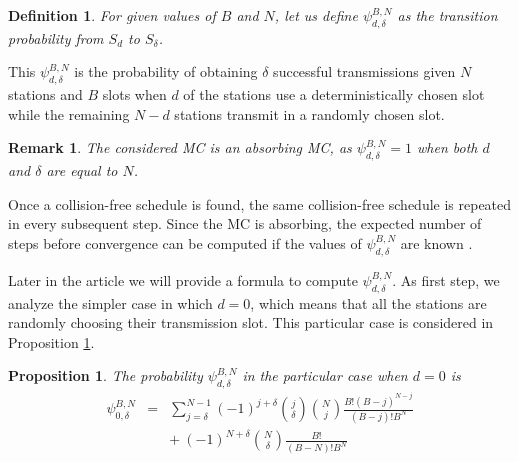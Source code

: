 \documentclass[journal]{IEEEtran}
\newtheorem{definition}{Definition}
\newtheorem{proposition}{Proposition}
\newtheorem{remark}{Remark}
\begin{document}
\begin{definition}
For given values of $B$ and $N$, let us define $\psi_{d,\delta}^{B,N}$ as the transition probability from $S_d$ to $S_\delta$. 
\end{definition}

This $\psi_{d,\delta}^{B,N}$ is the probability of obtaining $\delta$ successful transmissions given $N$ stations and $B$ slots when $d$ of the stations use a deterministically chosen slot while the remaining $N-d$ stations transmit in a randomly chosen slot.

\begin{remark}
The considered MC is an absorbing MC, as $\psi_{d,\delta}^{B,N}=1$ when both $d$ and $\delta$ are equal to $N$.
\end{remark}

Once a collision-free schedule is found, the same collision-free schedule is repeated in every subsequent step.
Since the MC is absorbing, the expected number of steps before convergence can be computed if the values of $\psi_{d,\delta}^{B,N}$ are known \cite{grinstead1997ip}.

Later in the article we will provide a formula to compute $\psi_{d,\delta}^{B,N}$.
As first step, we analyze the simpler case in which $d=0$, which means that all the stations are randomly choosing their transmission slot. 
This particular case is considered in Proposition \ref{pro:zero_case}.

\begin{proposition}
\label{pro:zero_case}
The probability $\psi^{B,N}_{d,\delta}$ in the particular case when $d=0$ is 
\setlength{\arraycolsep}{0.0em}
\begin{eqnarray}
\psi^{B,N}_{0,\delta} & {}={} &\sum_{j=\delta}^{N-1} (-1)^{j+\delta}\binom{j}{\delta} \binom{N}{j}\frac{B! (B-j)^{N-j}}{(B-j)! B^N} \\
&&{+}\:(-1)^{N+\delta}\binom{N}{\delta}\frac{B!}{(B-N)!B^N}
\label{eq:psi_zero}
\end{eqnarray}
\end{proposition}
\end{document}
